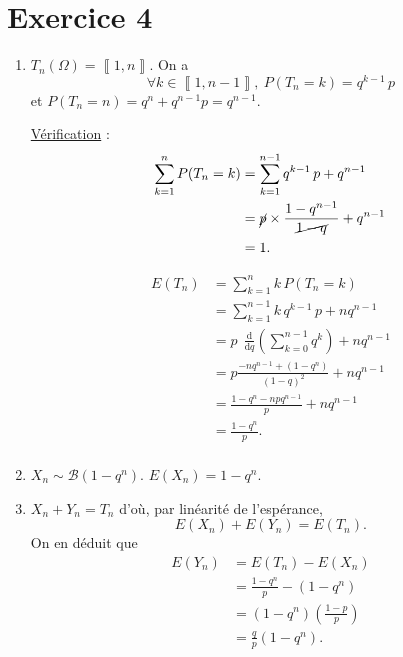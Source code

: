 \part{Exercice 4}

\begin{enumerate}
	\item $T_n(\Omega) = \left\llbracket 1,n \right\rrbracket$. On a
		\[
			\forall k \in \left\llbracket 1,n-1 \right\rrbracket,\:P(T_n = k) = q^{k-1}\,p
		\] et $P(T_n = n) = q^n + q^{n-1} p = q^{n-1}$.

		\underline{Vérification} :
		\begin{align*}
			\sum_{k=1}^n P(T_n = k) &= \sum_{k=1}^{n-1} q^{k-1}\,p + q^{n-1} \\
			&= \cancel p \times \frac{1-q^{n-1}}{\cancel{1-q}} + q^{n-1} \\
			&= 1. \\
		\end{align*}

		\begin{align*}
			E(T_n) &= \sum_{k=1}^n k\,P(T_n = k)\\
			&= \sum_{k=1}^{n-1} k\,q^{k-1}\,p + nq^{n-1} \\
			&= p\:\:\frac{\mathrm{d}}{\mathrm{d}q}\left( \sum_{k=0}^{n-1} q^k \right) + nq^{n-1}\\
			&= p \frac{-nq^{n-1} + (1-q^n)}{(1-q)^2} + nq^{n-1} \\
			&= \frac{1 - q^n - npq^{n-1}}{p} + nq^{n-1} \\
			&= \frac{1-q^n}{p}. \\
		\end{align*}
	\item $X_n \sim \mathcal{B}(1-q^n)$. $E(X_n) = 1 - q^n$.
	\item $X_n + Y_n = T_n$ d'où, par linéarité de l'espérance, \[
			E(X_n) + E(Y_n) = E(T_n)
		.\] On en déduit que
		\begin{align*}
			E(Y_n) &= E(T_n) - E(X_n) \\
			&= \frac{1-q^n}{p} - (1-q^n) \\
			&= (1-q^n) \left( \frac{1-p}{p} \right) \\
			&= \frac{q}{p}(1-q^n). \\
		\end{align*}
\end{enumerate}
